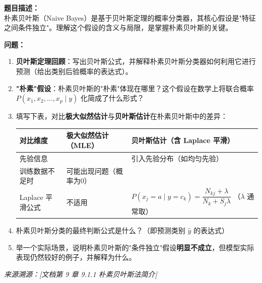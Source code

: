 \documentclass[a4paper,11pt]{ctexart}
\begin{document}
\begin{problembox}
    \textbf{题目描述：}\\
    朴素贝叶斯（Naive Bayes）是基于贝叶斯定理的概率分类器，其核心假设是"特征之间条件独立"。理解这个假设的含义与局限，是掌握朴素贝叶斯的关键。

    \vspace{0.3cm}
    \textbf{问题：}
    \begin{enumerate}[(1)]
        \item \textbf{贝叶斯定理回顾}：写出贝叶斯公式，并解释朴素贝叶斯分类器如何利用它进行预测（给出类别后验概率的表达式）。

        \item \textbf{"朴素"假设}：朴素贝叶斯的"朴素"体现在哪里？这个假设在数学上将联合概率 $P(x_1, x_2, \ldots, x_p \mid y)$ 化简成了什么形式？

        \item 填写下表，对比\textbf{极大似然估计}与\textbf{贝叶斯估计}在朴素贝叶斯中的差异：

        \begin{center}
        \begin{tabular}{p{3.5cm} p{4.5cm} p{4.5cm}}
            \toprule
            对比维度 & 极大似然估计（MLE） & 贝叶斯估计（含 Laplace 平滑） \\
            \midrule
            先验信息 & \underline{\hspace{3.5cm}} & 引入先验分布（如均匀先验） \\[1.2em]
            训练数据不足时 & 可能出现\underline{\hspace{2cm}}问题（概率为0） & \underline{\hspace{3.5cm}} \\[1.2em]
            Laplace 平滑公式 & 不适用 & $P(x_j=a \mid y=c_k) = \dfrac{N_{kj} + \lambda}{N_k + S_j \lambda}$ \newline（$\lambda$ 通常取\underline{\quad}） \\
            \bottomrule
        \end{tabular}
        \end{center}

        \item 朴素贝叶斯分类的最终判断公式是什么？（即预测类别 $\hat{y}$ 的表达式）

        \item 举一个实际场景，说明朴素贝叶斯的"条件独立"假设\textbf{明显不成立}，但模型实际表现仍然较好的例子，并解释为什么。
    \end{enumerate}

    \vspace{0.2cm}
    {\color{gray}\small\textit{来源溯源：[文档第 9 章 9.1.1 朴素贝叶斯法简介]}}
\end{problembox}
\end{document}
